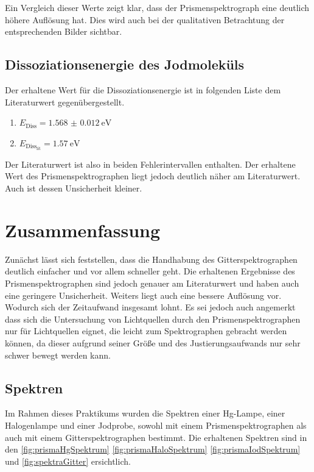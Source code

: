 \documentclass[12pt,english,ngerman]{scrartcl}
\begin{document}
Ein Vergleich dieser Werte zeigt klar, dass der Prismenspektrograph eine
deutlich höhere Auflösung hat. Dies wird auch bei der qualitativen Betrachtung
der entsprechenden Bilder sichtbar.

\subsection{Dissoziationsenergie des Jodmoleküls}

Der erhaltene Wert für die Dissoziationsenergie ist in folgenden Liste dem
Literaturwert gegenübergestellt.

\begin{enumerate}
	\item $E_\text{Diss} = \SI{1.568(12)}{\electronvolt}$
	\item $E_{\text{Diss}_\text{lit}} = \SI{1.57}{\electronvolt}$
\end{enumerate}

Der Literaturwert ist also in beiden Fehlerintervallen enthalten. Der erhaltene
Wert des Prismenspektrographen liegt jedoch deutlich näher am Literaturwert.
Auch ist dessen Unsicherheit kleiner.

\section{Zusammenfassung}\label{sec:zs}
Zunächst lässt sich feststellen, dass die Handhabung des Gitterspektrographen
deutlich einfacher und vor allem schneller geht. Die erhaltenen Ergebnisse des
Prismenspektrographen sind jedoch genauer am Literaturwert und haben auch eine
geringere Unsicherheit. Weiters liegt auch eine bessere Auflösung vor. Wodurch
sich der Zeitaufwand insgesamt lohnt. Es sei jedoch auch angemerkt dass sich
die Untersuchung von Lichtquellen durch den Prismenspektrographen nur für
Lichtquellen eignet, die leicht zum Spektrographen gebracht werden können, da
dieser aufgrund seiner Größe und des Justierungsaufwands nur sehr schwer bewegt
werden kann.

\subsection{Spektren}

Im Rahmen dieses Praktikums wurden die Spektren einer Hg-Lampe, einer
Halogenlampe und einer Jodprobe, sowohl mit einem Prismenspektrographen als
auch mit einem Gitterspektrographen bestimmt. Die erhaltenen Spektren sind in
den \autoref{fig:prismaHgSpektrum} \autoref{fig:prismaHaloSpektrum}
\autoref{fig:prismaIodSpektrum} und \autoref{fig:spektraGitter} ersichtlich.
\end{document}
